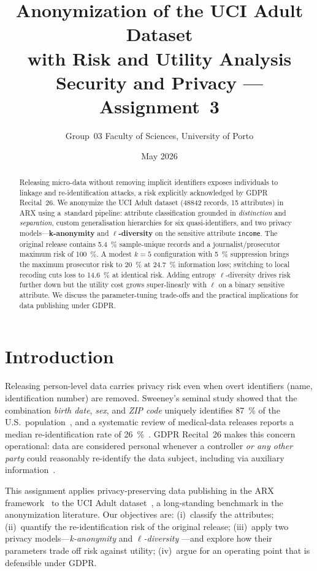 \documentclass[a4paper,10pt]{article}
\title{\vspace{-1.5em}
  \textbf{Anonymization of the UCI Adult Dataset\\
  with Risk and Utility Analysis}\\[0.3em]
  \large Security and Privacy --- Assignment~3}
\author{
  \small
  Group~03 \quad
  Faculty of Sciences, University of Porto
}
\date{\small May 2026}
\begin{document}
\maketitle
\vspace{-2em}

\begin{abstract}\small
\noindent
Releasing micro-data without removing implicit identifiers exposes
individuals to linkage and re-identification attacks, a risk explicitly
acknowledged by GDPR Recital~26. We anonymize the UCI Adult dataset
(\num{48842} records, 15 attributes) in ARX using a~standard pipeline:
attribute classification grounded in \emph{distinction} and
\emph{separation}, custom generalisation hierarchies for six
quasi-identifiers, and two privacy models---\textbf{k-anonymity} and
\textbf{$\ell$-diversity} on the sensitive attribute \texttt{income}.
The original release contains \SI{5.4}{\percent} sample-unique records and a
journalist/prosecutor maximum risk of \SI{100}{\percent}. A modest
$k{=}5$ configuration with \SI{5}{\percent} suppression brings the
maximum prosecutor risk to \SI{20}{\percent} at \SI{24.7}{\percent}
information loss; switching to local recoding cuts loss to
\SI{14.6}{\percent} at identical risk. Adding entropy
$\ell$-diversity drives risk further down but the utility cost grows
super-linearly with $\ell$ on a binary sensitive attribute. We
discuss the parameter-tuning trade-offs and the practical implications
for data publishing under GDPR.
\end{abstract}

\section{Introduction}
\label{sec:intro}

Releasing person-level data carries privacy risk even when overt
identifiers (name, identification number) are removed.
Sweeney's seminal study showed that the combination
\emph{birth date}, \emph{sex}, and \emph{ZIP code} uniquely identifies
\SI{87}{\percent} of the U.S.\ population~\cite{sweeney2002k}, and a
systematic review of medical-data releases reports a median
re-identification rate of \SI{26}{\percent}~\cite{elemam2011quantifying}.
GDPR Recital~26 makes this concern operational: data are considered
personal whenever a controller \emph{or any other party} could
reasonably re-identify the data subject, including via auxiliary
information~\cite{gdpr2016}.

This assignment applies privacy-preserving data publishing in the
ARX framework~\cite{prasser2020arx,prasser2014arx} to the
UCI Adult dataset~\cite{ucibradult}, a long-standing benchmark in
the anonymization literature. Our objectives are: (i)~classify the
attributes; (ii)~quantify the re-identification risk of the original
release; (iii)~apply two privacy models---\emph{k-anonymity}
\cite{sweeney2002k} and \emph{$\ell$-diversity}
\cite{machanavajjhala2007ldiversity}---and explore how their
parameters trade off risk against utility; (iv)~argue for an operating
point that is defensible under GDPR.
\end{document}
